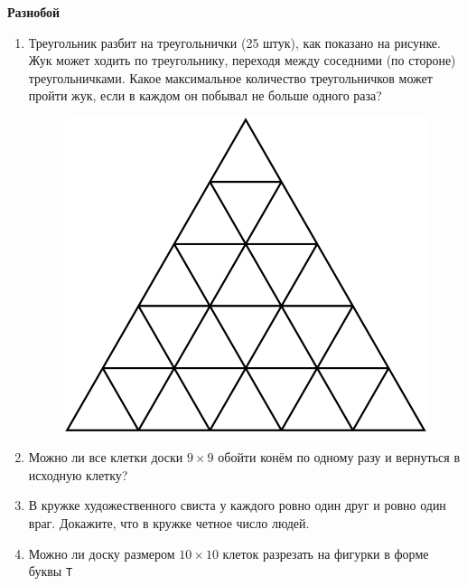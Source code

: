 \documentclass{article}
\begin{document}
\large
	
\begin{center}
	\textbf{Разнобой}
\end{center}


\begin{enumerate}[label*=\protect\fbox{\arabic{enumi}}]

\item Треугольник разбит на треугольнички (25 штук), как показано на рисунке. Жук может ходить по треугольнику, переходя между соседними (по стороне) треугольничками. Какое максимальное количество треугольничков может пройти жук, если в каждом он побывал не больше одного раза?

\begin{figure}[h]
	\centering
	\includegraphics[width=0.3\linewidth]{img.png}
\end{figure}

\item Можно ли все клетки доски $9 \times 9$ обойти конём по одному разу и вернуться в исходную клетку?

\item В кружке художественного свиста у каждого ровно один друг и ровно один враг. Докажите, что в кружке четное число людей.

\item Можно ли доску размером $10 \times 10$ клеток разрезать на фигурки в форме буквы \texttt{T}

\end{enumerate}
\end{document}
